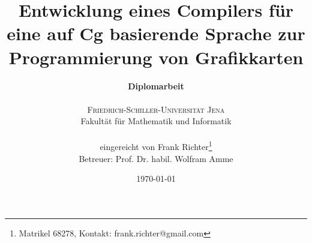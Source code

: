 \documentclass[twoside,a4paper,fleqn,12pt]{book}
\title{\usefont{OT1}{phv}{b}{n}\selectfont Entwicklung eines Compilers für eine auf Cg basierende Sprache zur Programmierung von Grafikkarten \normalfont}
\author{{\Large \textbf{Diplomarbeit}}\\
\vspace{1em}\\
{\large \textsc{Friedrich-Schiller-Universität Jena}}\\
{\large Fakultät für Mathematik und Informatik}\\
\vspace{1em}\\
eingereicht von Frank Richter\thanks{Matrikel 68278, Kontakt: frank.richter@gmail.com}\\
Betreuer: Prof. Dr. habil. Wolfram Amme}
\date{\vspace{1em}\today}
\begin{document}
\sloppy

\newcommand\btxandlong{und}
\newcommand\btxandshort{u}
\newcommand\Btxinlong{In}
\newcommand\Btxinshort{I}
\newcommand\btxpageslong{Seiten}
\newcommand\btxetalshort{et al}
\newcommand\btxeditionlong{Auflage}


\newcommand\defltbaselinestretch[0]{\renewcommand{\baselinestretch}{1.42}}
\defltbaselinestretch\normalsize


\newcommand{\captionstyle}{\small\centering}

\makeatletter  %
\long\def\@makecaption#1#2{%
  \vskip\abovecaptionskip
  \sbox\@tempboxa{{\captionstyle #1: #2}}%
  \ifdim \wd\@tempboxa >\hsize
    {\captionstyle #1: #2\par}
  \else
    \hbox to\hsize{\hfil\box\@tempboxa\hfil}%
  \fi
  \vskip\belowcaptionskip}
\makeatother   %

\makeatletter
\newlength{\myFootnoteWidth}
\newlength{\myFootnoteLabel}
\setlength{\myFootnoteLabel}{1.2em}%
\renewcommand{\@makefntext}[1]{%
  \setlength{\myFootnoteWidth}{\columnwidth}%
  \addtolength{\myFootnoteWidth}{-\myFootnoteLabel}%
  \noindent\makebox[\myFootnoteLabel][r]{\@makefnmark\ }%
  \parbox[t]{\myFootnoteWidth}{#1}%
}
\makeatother

\titlepage
\maketitle

\thispagestyle{empty}
\newpage
\thispagestyle{empty}
\mbox{}

\end{document}
